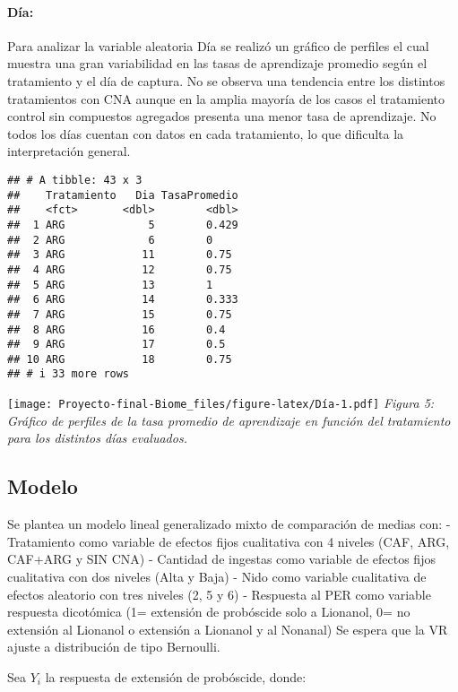 \documentclass[
  11pt,
]{article}
\begin{document}
\paragraph{Día:}\label{duxeda}

Para analizar la variable aleatoria Día se realizó un gráfico de
perfiles el cual muestra una gran variabilidad en las tasas de
aprendizaje promedio según el tratamiento y el día de captura. No se
observa una tendencia entre los distintos tratamientos con CNA aunque en
la amplia mayoría de los casos el tratamiento control sin compuestos
agregados presenta una menor tasa de aprendizaje. No todos los días
cuentan con datos en cada tratamiento, lo que dificulta la
interpretación general.

\begin{verbatim}
## # A tibble: 43 x 3
##    Tratamiento   Dia TasaPromedio
##    <fct>       <dbl>        <dbl>
##  1 ARG             5        0.429
##  2 ARG             6        0    
##  3 ARG            11        0.75 
##  4 ARG            12        0.75 
##  5 ARG            13        1    
##  6 ARG            14        0.333
##  7 ARG            15        0.75 
##  8 ARG            16        0.4  
##  9 ARG            17        0.5  
## 10 ARG            18        0.75 
## # i 33 more rows
\end{verbatim}

\texttt{[image: Proyecto-final-Biome\_files/figure-latex/Día-1.pdf]}
\emph{Figura 5: Gráfico de perfiles de la tasa promedio de aprendizaje
en función del tratamiento para los distintos días evaluados.}

\subsection{Modelo}\label{modelo}

Se plantea un modelo lineal generalizado mixto de comparación de medias
con: - Tratamiento como variable de efectos fijos cualitativa con 4
niveles (CAF, ARG, CAF+ARG y SIN CNA) - Cantidad de ingestas como
variable de efectos fijos cualitativa con dos niveles (Alta y Baja) -
Nido como variable cualitativa de efectos aleatorio con tres niveles (2,
5 y 6) - Respuesta al PER como variable respuesta dicotómica (1=
extensión de probóscide solo a Lionanol, 0= no extensión al Lionanol o
extensión a Lionanol y al Nonanal) Se espera que la VR ajuste a
distribución de tipo Bernoulli.

Sea \(Y_i\) la respuesta de extensión de probóscide, donde:
\end{document}
